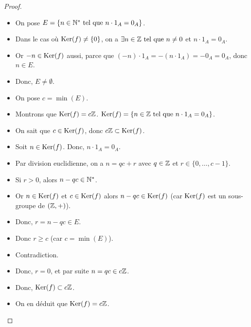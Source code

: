 \documentclass[12pt, a4paper]{report}
\begin{document}
\begin{proof}
    \begin{itemize}
        \item On pose $E=\{n\in\mathbb{N}^*\text{ tel que } n\cdot1_A = 0_A\}$.

        \item Dans le cas où $\mathrm{Ker}(f) \neq \{0\}$, on a $\exists n \in \mathbb{Z} \text{ tel que } n \neq 0$ et $n\cdot 1_A = 0_A$.

        \item Or $-n \in \mathrm{Ker}(f)$ aussi, parce que $(-n)\cdot 1_A = -(n\cdot 1_A) = -0_A = 0_A$, donc $n \in E$.

        \item Donc, $E \neq \emptyset$.

        \item On pose $c=\min(E)$.
        
        \item Montrons que $\mathrm{Ker}(f) = c\mathbb{Z}$. $\mathrm{Ker}(f) = \{n\in\mathbb{Z} \text{ tel que } n\cdot 1_A = 0_A\}$.

        \item On sait que $c \in \mathrm{Ker}(f)$, donc $c\mathbb{Z} \subset \mathrm{Ker}(f)$.

        \item Soit $n \in \mathrm{Ker}(f)$. Donc, $n\cdot 1_A = 0_A$.

        \item Par division euclidienne, on a $n = qc + r$ avec $q \in \mathbb{Z}$ et $r \in \{0, \ldots, c-1\}$.

        \item Si $r>0$, alors $n-qc\in\mathbb{N}^*$.
        \item Or $n\in\mathrm{Ker}(f)$ et $c\in\mathrm{Ker}(f)$ alors $n - qc \in \mathrm{Ker}(f)$ (car $\mathrm{Ker}(f)$ est un sous-groupe de $(\mathbb{Z},+)$).
        \item Donc, $r = n - qc \in E$.
        \item Donc $r \ge c$ (car $c = \min(E)$).
        \item Contradiction.
        \item Donc, $r=0$, et par suite $n = qc \in c\mathbb{Z}$.
        \item Donc, $\mathrm{Ker}(f) \subset c\mathbb{Z}$.
        \item On en déduit que $\mathrm{Ker}(f) = c\mathbb{Z}$.
    \end{itemize}
    
\end{proof}
\end{document}
